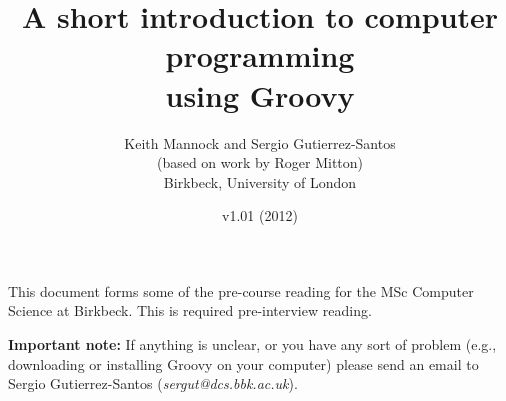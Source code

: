 \documentclass[11pt,a4paper]{article}
\title{A short introduction to computer programming\\using Groovy}
\author{Keith Mannock and Sergio Gutierrez-Santos\\(based on work by
  Roger Mitton)\\
Birkbeck, University of London}
\date{v1.01 (2012)}
\begin{document}
\maketitle



\noindent This document forms some of the pre-course reading for the
MSc Computer Science at Birkbeck. This is required pre-interview reading. 

\textbf{Important note: }If anything is unclear, or you have any sort of problem (e.g.,
downloading or installing Groovy on your computer) please send an
email to Sergio Gutierrez-Santos (\emph{sergut@dcs.bbk.ac.uk}).


\newpage

\newpage

\newpage

\newpage

\newpage

\newpage

\newpage

\end{document}
